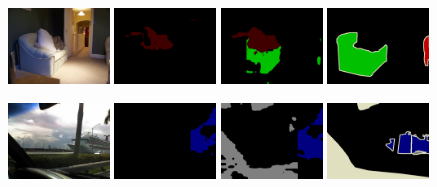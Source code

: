 \begin{figure}[t]
  {\includegraphics[width=0.24\textwidth]{figures/experiments/pascal/0010.jpg}}
  {\includegraphics[width=0.24\textwidth]{figures/experiments/pascal/ft/0010.png}}
  {\includegraphics[width=0.24\textwidth]{figures/experiments/pascal/highres+ge/0010.png}}
  {\includegraphics[width=0.24\textwidth]{figures/experiments/pascal/gt/2007_000452.png}}
  
  {\includegraphics[width=0.24\textwidth]{figures/experiments/pascal/0013.jpg}}
  {\includegraphics[width=0.24\textwidth]{figures/experiments/pascal/ft/0013.png}}
  {\includegraphics[width=0.24\textwidth]{figures/experiments/pascal/highres+ge/0013.png}}
  {\includegraphics[width=0.24\textwidth]{figures/experiments/pascal/gt/2007_000529.png}}


\end{figure}
